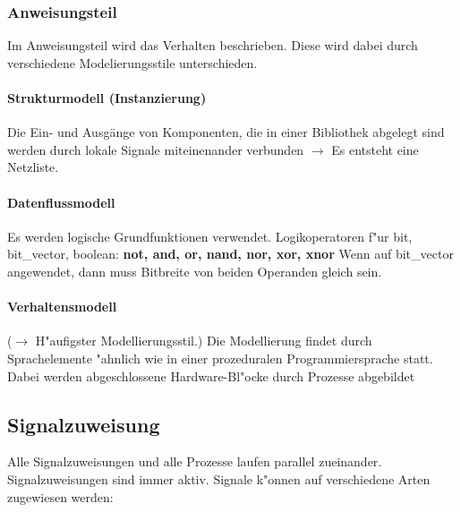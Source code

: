 		\subsubsection{Anweisungsteil}
			Im Anweisungsteil wird das Verhalten beschrieben. Diese wird dabei 		
			durch verschiedene Modelierungsstile unterschieden.
			\begin{multicols}{2}
				\paragraph{Strukturmodell (Instanzierung)}
				Die Ein- und Ausgänge von Komponenten, die 
				in einer Bibliothek abgelegt sind werden durch lokale Signale miteinenander 
				verbunden $\rightarrow$ Es entsteht eine Netzliste. 
				
			
			
			\paragraph{Datenflussmodell}
				Es werden logische Grundfunktionen verwendet.
				Logikoperatoren f"ur bit, bit\_vector, boolean: \textbf{not, and, or, nand, nor,
 				xor, xnor	} Wenn auf bit\_vector angewendet, dann muss Bitbreite von 
				beiden Operanden gleich sein.

					
					
			\end{multicols}
			\paragraph{Verhaltensmodell} ($\rightarrow$ H"aufigster Modellierungsstil.) 
				Die Modellierung findet durch Sprachelemente "ahnlich wie in einer 	
				prozeduralen Programmiersprache statt.\\
				Dabei werden abgeschlossene Hardware-Bl"ocke durch Prozesse 
				abgebildet
				

	\subsection{Signalzuweisung}
		Alle Signalzuweisungen und alle Prozesse laufen parallel zueinander. Signalzuweisungen sind immer aktiv. Signale k"onnen auf verschiedene Arten zugewiesen werden:
		\begin{multicols}{2}
			
		\end{multicols}

